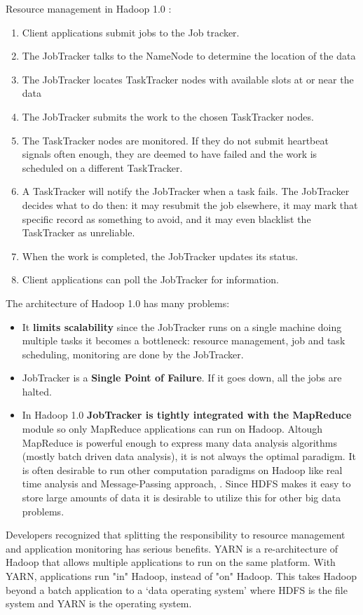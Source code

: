 Resource management in Hadoop 1.0 \cite{Hadoop1.0}:
\begin{enumerate}
\item Client applications submit jobs to the Job tracker.
\item The JobTracker talks to the NameNode to determine the location of the data
\item The JobTracker locates TaskTracker nodes with available slots at or near the data
\item The JobTracker submits the work to the chosen TaskTracker nodes.
\item The TaskTracker nodes are monitored. If they do not submit heartbeat signals often enough, they are deemed to have failed and the work is scheduled on a different TaskTracker.
\item A TaskTracker will notify the JobTracker when a task fails. The JobTracker decides what to do then: it may resubmit the job elsewhere, it may mark that specific record as something to avoid, and it may even blacklist the TaskTracker as unreliable.
\item When the work is completed, the JobTracker updates its status.
\item Client applications can poll the JobTracker for information.
\end{enumerate}

The architecture of Hadoop 1.0 has many problems:
\begin{itemize}
	\item  It \textbf{limits scalability} since the JobTracker runs on a single machine doing multiple tasks it becomes a bottleneck: resource management, job and task scheduling, monitoring are done by the JobTracker.
	\item JobTracker is a \textbf{Single Point of Failure}. If it goes down, all the jobs are halted.
	\item In Hadoop 1.0 \textbf{JobTracker is tightly integrated with the MapReduce} module so only MapReduce applications can run on Hadoop. Altough MapReduce is powerful enough to express many data analysis algorithms (mostly batch driven data analysis), it is not always the optimal paradigm. It is often desirable to run other computation paradigms on Hadoop like real time analysis and Message-Passing approach, \etc. Since HDFS makes it easy to store large amounts of data it is desirable to utilize this for other big data problems.
\end{itemize}

Developers recognized that splitting the responsibility to resource management and application monitoring has serious benefits. YARN is a re-architecture of Hadoop that allows multiple applications to run on the same platform. With YARN, applications run "in" Hadoop, instead of "on" Hadoop. This takes Hadoop beyond a batch application to a ‘data operating system’ where HDFS is the file system and YARN is the operating system. 

